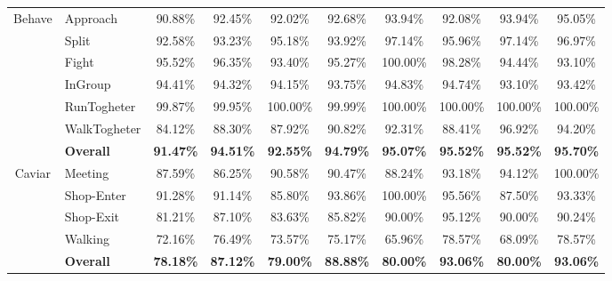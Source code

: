 \begin{table}
{\begin{tabular}{|c|l|c|c|c|c|c|c|c|c|}
	\hline
	\multirow{7}{*}{Behave}            & Approach          & 90.88\%           & 92.45\%           & 92.02\%           & 92.68\%           & 93.94\%           & 92.08\%           & 93.94\%           & 95.05\%            \\ 
	\cline{2-10}
	& Split             & 92.58\%           & 93.23\%           & 95.18\%           & 93.92\%           & 97.14\%           & 95.96\%           & 97.14\%           & 96.97\%            \\ 
	\cline{2-10}
	& Fight             & 95.52\%           & 96.35\%           & 93.40\%           & 95.27\%           & 100.00\%          & 98.28\%           & 94.44\%           & 93.10\%            \\ 
	\cline{2-10}
	& InGroup           & 94.41\%           & 94.32\%           & 94.15\%           & 93.75\%           & 94.83\%           & 94.74\%           & 93.10\%           & 93.42\%            \\ 
	\cline{2-10}
	& RunTogheter       & 99.87\%           & 99.95\%           & 100.00\%          & 99.99\%           & 100.00\%          & 100.00\%          & 100.00\%          & 100.00\%           \\ 
	\cline{2-10}
	& WalkTogheter      & 84.12\%           & 88.30\%           & 87.92\%           & 90.82\%           & 92.31\%           & 88.41\%           & 96.92\%           & 94.20\%            \\ 
	\cline{2-10}
	& \textbf{Overall}  & \textbf{91.47\%}  & \textbf{94.51\%}  & \textbf{92.55\%}  & \textbf{94.79\%}  & \textbf{95.07\%}  & \textbf{95.52\%}  & \textbf{95.52\%}  & \textbf{95.70\%}   \\ 
	\hline
	\multirow{5}{*}{Caviar} & Meeting           & 87.59\%           & 86.25\%           &  90.58\%               & 90.47\%            & 88.24\%           & 93.18\%           &  94.12\%               & 100.00\%             \\ 
	\cline{2-10}
	& Shop-Enter        & 91.28\%           & 91.14\%           & 85.80\%                & 93.86\%               & 100.00\%          & 95.56\%           & 87.50\%              & 93.33\%            \\ 
	\cline{2-10}
	& Shop-Exit         & 81.21\%           & 87.10\%           & 83.63\%                & 85.82\%                & 90.00\%           & 95.12\%           & 90.00\%                 & 90.24\%                 \\ 
	\cline{2-10}
	& Walking           & 72.16\%           & 76.49\%           & 73.57\%                 & 75.17\%                & 65.96\%           & 78.57\%           & 68.09\%               & 78.57\%                  \\ 
	\cline{2-10}
	& \textbf{Overall}  & \textbf{78.18\%}  & \textbf{87.12\%}  & \textbf{79.00\%}         & \textbf{88.88\%}         & \textbf{80.00\%}  & \textbf{93.06\%}  & \textbf{80.00\%}         & \textbf{93.06\%}          \\
	\hline
	\end{tabular}}
\end{table}
